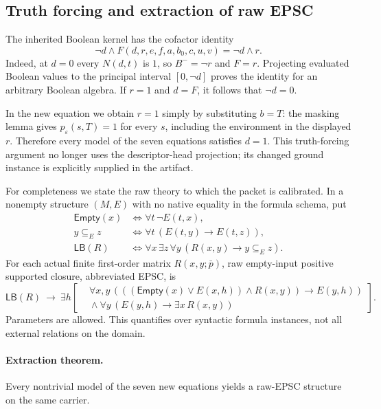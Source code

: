 \subsection{Truth forcing and extraction of raw EPSC}

The inherited Boolean kernel has the cofactor identity
\begin{equation}
 \neg d\wedge F(d,r,e,f,a,b_0,c,u,v)=\neg d\wedge r.
 \label{eq:e639-cofactor}
\end{equation}
Indeed, at $d=0$ every $N(d,t)$ is $1$, so $B^-=\neg r$
and $F=r$.  Projecting evaluated Boolean values to the principal
interval $[0,\neg d]$ proves the identity for an arbitrary Boolean
algebra.  If $r=1$ and $d=F$, it follows that $\neg d=0$.

In the new equation we obtain $r=1$ simply by substituting $b=T$:
the masking lemma gives $p_\varepsilon(s,T)=1$ for every $s$,
including the environment in the displayed $r$.  Therefore
every model of the seven equations satisfies $d=1$.
This truth-forcing argument no longer uses the descriptor-head
projection; its changed ground instance is explicitly supplied in
the artifact.

For completeness we state the raw theory to which the packet is
calibrated.  In a nonempty structure $(M,E)$ with no native equality
in the formula schema, put
\begin{align*}
 \mathsf{Empty}(x)&\iff\forall t\,\neg E(t,x),\\
 y\subseteq_E z&\iff\forall t\,(E(t,y)\to E(t,z)),\\
 \mathsf{LB}(R)&\iff\forall x\,\exists z\,\forall y\,
                          (R(x,y)\to y\subseteq_E z).
\end{align*}
For each actual finite first-order matrix $R(x,y;\bar p)$, raw
empty-input positive supported closure, abbreviated EPSC, is
\begin{equation}
\mathsf{LB}(R)\ \longrightarrow\
\exists h\left[
\begin{aligned}
 &\forall x,y\,
  (((\mathsf{Empty}(x)\lor E(x,h))\land R(x,y))\to E(y,h))\\
 &{}\land\forall y\,(E(y,h)\to\exists x\,R(x,y))
\end{aligned}\right].
\label{eq:e639-epsc}
\end{equation}
Parameters are allowed.  This quantifies over syntactic formula
instances, not all external relations on the domain.

\paragraph{Extraction theorem.}
Every nontrivial model of the seven new equations yields a raw-EPSC
structure on the same carrier.

